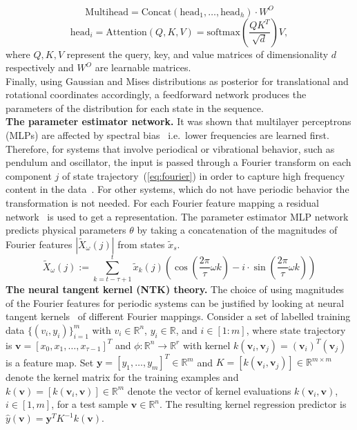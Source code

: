 \documentclass[acmtog]{techreportacmart}
\begin{document}
\begin{equation}
  \label{eq:multihead}
  \text{Multihead} = \text{Concat}(\text{head}_1, \ldots, \text{head}_h) \cdot W^{O}
\end{equation}
\begin{equation}
  \label{eq:attention}
  \text{head}_i = \text{Attention}(Q, K, V) = \text{softmax}\left(\frac{{QK^T}}{\sqrt{d}}\right)V,
\end{equation}
where ${Q, K, V}$ represent the query, key, and value matrices of dimensionality ${d}$ respectively and $W^{O}$ are learnable matrices.\\
Finally, using Gaussian and Mises distributions as posterior for translational and rotational coordinates accordingly, a feedforward network produces the parameters of the distribution for each state in the sequence.
\\
\textbf{The parameter estimator network.} It was shown that multilayer perceptrons (MLPs) are affected by spectral bias~\cite{rahamanspectral} i.e.~lower frequencies are learned first. Therefore, for systems that involve periodical or vibrational behavior, such as pendulum and oscillator, the input is passed through a Fourier transform on each component ${j}$ of state trajectory~(\ref{eq:fourier}) in order to capture high frequency content in the data~\cite{tancik2020ffn}. For other systems, which do not have periodic behavior the transformation is not needed. For each Fourier feature mapping a residual network~\cite{7780459} is used to get a representation. The parameter estimator MLP network predicts physical parameters ${\theta}$ by taking a concatenation of the magnitudes of Fourier features ${|\tilde{X}_{\omega}(j)|}$ from states $\tilde{x}_{s}$.
\begin{equation}
  \label{eq:fourier}
  \tilde{X}_{\omega}(j) := \sum_{k=t-\tau+1}^{t} \tilde{x}_k(j) \left( \cos \left(\frac{2\pi}{\tau} \omega k \right) - i \cdot \sin \left(\frac{2\pi}{\tau} \omega k \right) \right)
\end{equation}
\textbf{The neural tangent kernel (NTK) theory.} The choice of using magnitudes of the Fourier features for periodic systems can be justified by looking at neural tangent kernels~\cite{NEURIPS2018_5a4be1fa} of different Fourier mappings. Consider a set of labelled training data $\{(v_i, y_i)\}_{i=1}^{m}$ with $v_i \in \mathbb{R}^n$, $y_i \in \mathbb{R}$, and $i \in [1 : m]$, where state trajectory is ${\mathbf{v} = [x_0, x_1, \ldots, x_{\tau-1}]^T}$ and ${\phi: \mathbb{R}^n \rightarrow \mathbb{R}^r}$ with kernel ${k(\mathbf{v}_i, \mathbf{v}_j) = (\mathbf{v}_i)^T (\mathbf{v}_j)}$ is a feature map. Set $\mathbf{y} = [y_1, \ldots, y_m]^T \in \mathbb{R}^m$ and $K = [k(\mathbf{v}_i, \mathbf{v}_j)] \in \mathbb{R}^{m \times m}$ denote the kernel matrix for the training examples and $k(\mathbf{v}) = [k(\mathbf{v}_i, \mathbf{v})] \in \mathbb{R}^{m}$ denote the vector of kernel evaluations $k(\mathbf{v}_i, \mathbf{v})$, $i \in [1, m]$, for a test sample $\mathbf{v} \in \mathbb{R}^n$. The resulting kernel regression predictor is $\hat{y}(\mathbf{v}) = \mathbf{y}^T K^{-1} k(\mathbf{v})$.
\end{document}
